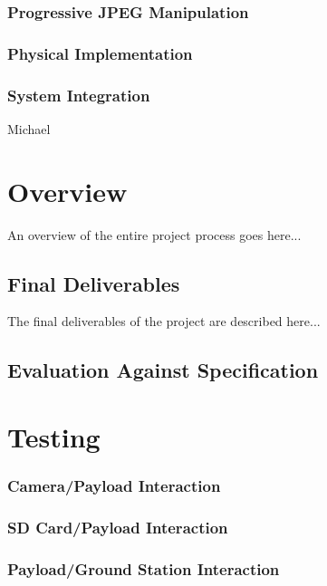 \documentclass[oneside]{ecsgdp}         %
\begin{document}
\subsection{Progressive JPEG Manipulation}

\subsection{Physical Implementation}


\subsection{System Integration}
Michael

\chapter{Overview}
An overview of the entire project process goes here...

\section{Final Deliverables}
The final deliverables of the project are described here...

\section{Evaluation Against Specification}


\chapter{Testing}

\subsection{Camera/Payload Interaction}

\subsection{SD Card/Payload Interaction}

\subsection{Payload/Ground Station Interaction}
\end{document}
